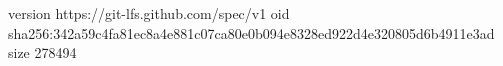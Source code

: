 version https://git-lfs.github.com/spec/v1
oid sha256:342a59c4fa81ec8a4e881c07ca80e0b094e8328ed922d4e320805d6b4911e3ad
size 278494
